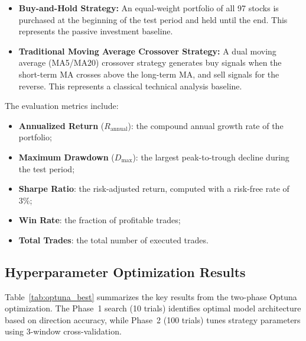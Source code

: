 \documentclass[12pt, a4paper]{article}
\begin{document}
\begin{itemize}[leftmargin=2em]
    \item \textbf{Buy-and-Hold Strategy:} An equal-weight portfolio of all 97 stocks is purchased at the beginning of the test period and held until the end. This represents the passive investment baseline.
    \item \textbf{Traditional Moving Average Crossover Strategy:} A dual moving average (MA5/MA20) crossover strategy generates buy signals when the short-term MA crosses above the long-term MA, and sell signals for the reverse. This represents a classical technical analysis baseline.
\end{itemize}

The evaluation metrics include:
\begin{itemize}[leftmargin=2em]
    \item \textbf{Annualized Return} ($R_{\text{annual}}$): the compound annual growth rate of the portfolio;
    \item \textbf{Maximum Drawdown} ($D_{\text{max}}$): the largest peak-to-trough decline during the test period;
    \item \textbf{Sharpe Ratio}: the risk-adjusted return, computed with a risk-free rate of 3\%;
    \item \textbf{Win Rate}: the fraction of profitable trades;
    \item \textbf{Total Trades}: the total number of executed trades.
\end{itemize}

\subsection{Hyperparameter Optimization Results}

Table~\ref{tab:optuna_best} summarizes the key results from the two-phase Optuna optimization. The Phase~1 search (10 trials) identifies optimal model architecture based on direction accuracy, while Phase~2 (100 trials) tunes strategy parameters using 3-window cross-validation.
\end{document}

